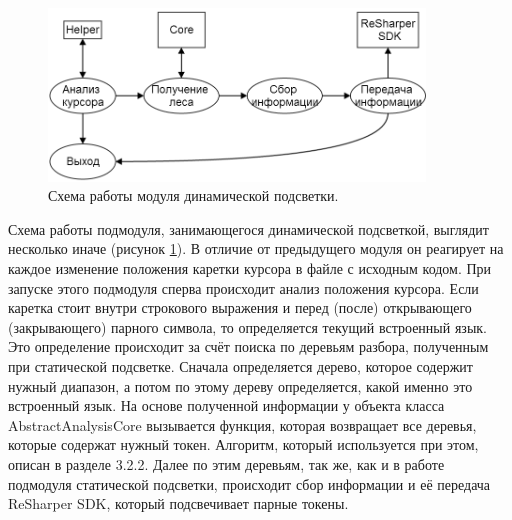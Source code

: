 \begin{figure}[h]
\centering
\includegraphics[width=100mm]{Pictures/dynamicHighlighting.png}
\caption{Схема работы модуля динамической подсветки.}
\label{dynamicHighlighting}
\end{figure}

Схема работы подмодуля, занимающегося динамической подсветкой, выглядит несколько иначе (рисунок \ref{dynamicHighlighting}). В отличие от предыдущего модуля он реагирует на каждое изменение положения каретки курсора в файле с исходным кодом. При запуске этого подмодуля сперва происходит анализ положения курсора. Если каретка стоит внутри строкового выражения и перед (после) открывающего (закрывающего) парного символа, то определяется текущий встроенный язык. Это определение происходит за счёт поиска по деревьям разбора, полученным при статической подсветке. Сначала определяется дерево, которое содержит нужный диапазон, а потом по этому дереву определяется, какой именно это встроенный язык. На основе полученной информации у объекта класса AbstractAnalysisCore вызывается функция, которая возвращает все деревья, которые содержат нужный токен. Алгоритм, который используется при этом, описан в разделе 3.2.2. Далее по этим деревьям, так же, как и в работе подмодуля статической подсветки, происходит сбор информации и её передача ReSharper SDK, который подсвечивает парные токены. 


